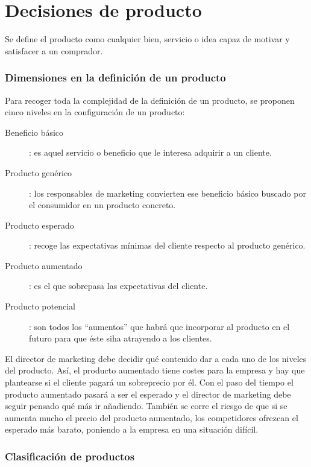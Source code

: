 \documentclass[10pt,a4paper,spanish]{report}
\begin{document}
	\section{\textcolor[rgb]{0.1,0.2,0.4}Decisiones de producto}

		Se define el producto como cualquier bien, servicio o idea capaz de motivar y satisfacer a un comprador.

		\subsubsection{\textcolor[rgb]{0.1,0.2,0.4}Dimensiones en la definición de un producto}	

			Para recoger toda la complejidad de la definición de un producto, se proponen cinco niveles en la configuración de un producto:

			\begin{description}
				\item[Beneficio básico]: es aquel servicio o beneficio que le interesa adquirir a un cliente.

				\item[Producto genérico]: los responsables de marketing convierten ese beneficio básico buscado por el consumidor en un producto concreto.

				\item[Producto esperado]: recoge las expectativas mínimas del cliente respecto al producto genérico.

				\item[Producto aumentado]: es el que sobrepasa las expectativas del cliente.

				\item[Producto potencial]: son todos los ``aumentos'' que habrá que incorporar al producto en el futuro para que éste siha atrayendo a los clientes.
			\end{description}

			El director de marketing debe decidir qué contenido dar a cada uno de los niveles del producto. Así, el producto aumentado tiene costes para la empresa y hay que plantearse si el cliente pagará un sobreprecio por él. Con el paso del tiempo el producto aumentado pasará a ser el esperado y el director de marketing debe seguir pensado qué más ir añadiendo. También se corre el riesgo de que si se aumenta mucho el precio del producto aumentado, los competidores ofrezcan el esperado más barato, poniendo a la empresa en una situación difícil.

		\subsubsection{\textcolor[rgb]{0.1,0.2,0.4}Clasificación de productos}
\end{document}
